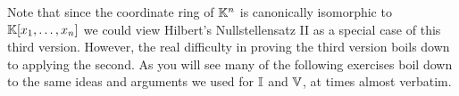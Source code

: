 \documentclass[Notebook.tex]{subfiles}
\begin{document}
Note that since the coordinate ring of $\mathbb K^n$ is canonically isomorphic to $\mathbb K[x_1,\ldots,x_n]$ we could view Hilbert's Nullstellensatz II as a special case of this third version. However, the real difficulty in proving the third version boils down to applying the second. As you will see many of the following exercises boil down to the same ideas and arguments we used for $\mathbb I$ and $\mathbb V$, at times almost verbatim. 

\hrulefill


%
\end{document}
